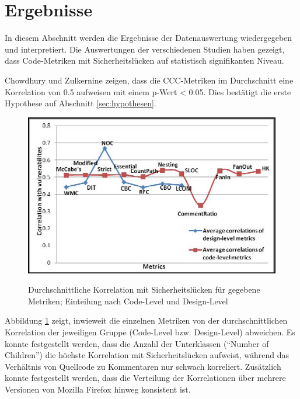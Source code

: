 \section{Ergebnisse}
\label{sec:ergebnisse}
In diesem Abschnitt werden die Ergebnisse der Datenauswertung wiedergegeben und interpretiert.
Die Auswertungen der verschiedenen Studien haben gezeigt, dass Code-Metriken mit Sicherheitslücken auf statistisch signifikanten Niveau\cite{chowdhury_zulkernine_2010,chowdhury_zulkernine_2009,alves_et_al}.

Chowdhury und Zulkernine \cite{chowdhury_zulkernine_2010} zeigen, dass die CCC-Metriken im Durchschnitt eine Korrelation von 0.5 aufweisen mit einem p-Wert < 0.05.
Dies bestätigt die erste Hypothese auf Abschnitt \ref{sec:hypothesen}.
\begin{figure}
	\includegraphics[width=\textwidth]{img/code_vs_design.png}
	\label{fig:code_vs_design}
	\caption{Durchschnittliche Korrelation mit Sicherheitslücken für gegebene Metriken; Einteilung nach Code-Level und Design-Level}
\end{figure}
Abbildung \ref{fig:code_vs_design} zeigt, inwieweit die einzelnen Metriken von der durchschnittlichen Korrelation der jeweiligen Gruppe (Code-Level bzw. Design-Level) abweichen.
Es konnte festgestellt werden, dass die Anzahl der Unterklassen ("`Number of Children"') die höchste Korrelation mit Sicherheitslücken aufweist, während das Verhältnis von Quellcode zu Kommentaren nur schwach korreliert.
Zusätzlich konnte festgestellt werden, dass die Verteilung der Korrelationen über mehrere Versionen von Mozilla Firefox hinweg konsistent ist.
